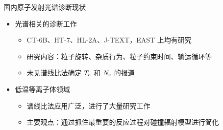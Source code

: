 \begin{CJK*}{UTF8}{kai}
\begin{frame}{国内原子发射光谱诊断现状}
	\begin{itemize}
		\item 光谱相关的诊断工作
			\begin{itemize}
				\item CT-6B、HT-7、HL-2A、J-TEXT，EAST 上均有研究
				\item 研究内容：粒子旋转、杂质行为、粒子约束时间、输运循环等
				\item 未见谱线比法确定 $T_{\rm e}$ 和 $N_{\rm e}$ 的报道
			\end{itemize}
		\bigskip
		\item 低温等离子体领域
			\begin{itemize}
				\item 谱线比法应用广泛，进行了大量研究工作 
				\item 主要观点：通过抓住最重要的反应过程对碰撞辐射模型进行简化\\ 
			\end{itemize}
	\end{itemize}
\end{frame}


\end{CJK*}

